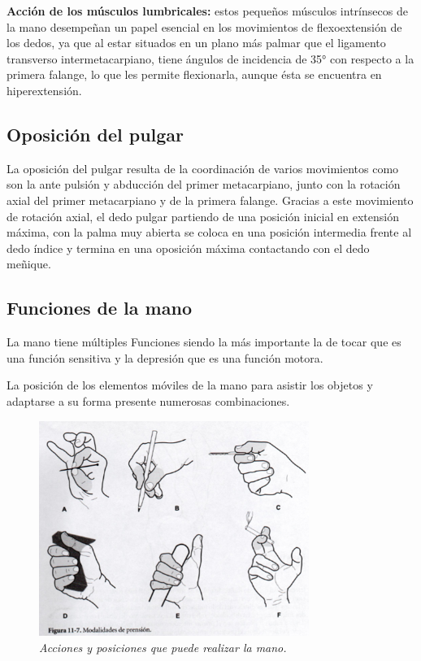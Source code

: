 \documentclass{article}
\begin{document}
\textbf{Acción de los músculos lumbricales:} estos pequeños músculos intrínsecos de la mano desempeñan un papel esencial en los movimientos de flexoextensión de los dedos, ya que al estar situados en un plano más palmar que el ligamento transverso intermetacarpiano, tiene ángulos de incidencia de 35° con respecto a la primera falange, lo que les permite flexionarla, aunque ésta se encuentra en hiperextensión.

\subsection{Oposición del pulgar}
La oposición del pulgar resulta de la coordinación de varios movimientos como son la ante pulsión y abducción del primer metacarpiano, junto con la rotación axial del primer metacarpiano y de la primera falange. Gracias a este movimiento de rotación axial, el dedo pulgar partiendo de una posición inicial en extensión máxima, con la palma muy abierta se coloca en una posición intermedia frente al dedo índice y termina en una oposición máxima contactando con el dedo meñique.

\subsection{Funciones de la mano}
La mano tiene múltiples Funciones siendo la más importante la de tocar que es una función sensitiva y la depresión que es una función motora.

La posición de los elementos móviles de la mano para asistir los objetos y adaptarse a su forma presente numerosas combinaciones.
\begin{figure}[H]
    \centering
    \includegraphics[height=7cm]{Imagenes/4.png}
    \caption{\textit{Acciones y posiciones que puede realizar la mano.}} %
    \label{exemploLabel}
    \end{figure}
\end{document}
